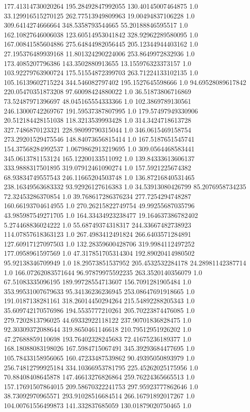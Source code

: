 177.41314730020264	195.28492847992055	130.40145007464875	1.0
33.129916515270125	262.77513949809963	19.00494837106228	1.0
309.6414274666664	348.5358793544665	55.20188846595517	1.0
162.10827646006038	123.60514953041842	328.92962289580095	1.0
167.00841585604886	275.64844982056445	205.12344944403162	1.0
27.195376489939168	11.801324290224006	253.8649972832936	1.0
173.4085207796386	143.3502880913655	13.155976323373157	1.0
103.92279763900724	175.51554872399703	263.71224133102135	1.0
105.16139602715224	344.546082797402	195.1527645598666	1.0
94.69528089617842	220.05470351873208	97.60098424880022	1.0
36.51873806716869	73.52487971396697	48.045165554333366	1.0
102.3869789130561	246.13000742269767	191.59537387807995	1.0
179.57497949330906	20.512184428151038	118.3213539993428	1.0
314.3424718613728	327.7486870123321	228.98099790315044	1.0
346.0615469158754	273.29201529475546	148.84073656815414	1.0
167.5187651545741	154.37568284992537	1.0679862913219695	1.0
309.0564468583441	345.0613781153124	165.12200133511092	1.0
139.84333613606137	333.9888317501895	319.07912461090274	1.0
157.5921225674382	68.93834749557543	246.11665204503748	1.0
136.87216840531465	238.16349563683332	93.92926127616383	1.0
34.53913080426799	85.2076958734235	72.32453286370854	1.0
39.768617286376234	277.7254294748287	160.66193704614955	1.0
270.26215822749754	49.99255687035796	43.985987549271705	1.0
164.33434923238477	19.164637386782402	5.274468836024222	1.0
55.68749374318317	244.33667482738923	114.07857618363123	1.0
267.4983412491824	266.6403571284891	127.60917127097503	1.0
132.28359600428706	319.9984112497252	177.0958961597569	1.0
47.317851705314304	192.89020414980502	95.92138346709949	1.0
18.29573851537952	205.4532532284178	24.28981142387714	1.0
166.07262083571644	96.97879975592235	263.3520140356079	1.0
67.51083335096195	189.99728554713607	156.7091281905484	1.0
353.99531007679633	95.34136236236945	253.08647691918665	1.0
191.0187138281161	318.26014450294264	215.54892288205343	1.0
35.609742170576986	194.5535777210261	205.70223874476085	1.0
279.7202813796025	44.69332922118122	237.90701836828475	1.0
92.30309372088644	319.8650461146618	210.79512951926202	1.0
47.27688859110698	193.76402328245683	72.41675236189377	1.0
168.18088083198026	167.5984715067491	345.39293684477695	1.0
105.78433158956065	160.47233487539862	90.49395050893979	1.0
256.74812799925184	334.10366953781795	225.45262025175956	1.0
70.88408408645878	147.46613276826864	259.76224365665513	1.0
157.17691507864015	209.58670322241753	297.95923777862646	1.0
38.73092970965571	293.91028516684514	266.16791892017267	1.0
104.00761556499873	141.332837685059	130.01879020750465	1.0
